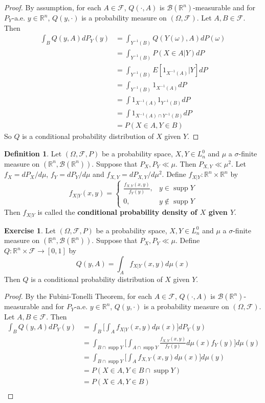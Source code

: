 \documentclass[12pt]{amsart}
\theoremstyle{definition}
\newtheorem{defn}[definition]{Definition}
\newtheorem{ex}[definition]{Exercise}
\DeclareMathOperator{\supp}{supp}
\newcommand{\sig}{\sigma}
\newcommand{\om}{\omega}
\newcommand{\Om}{\Omega}
\newcommand{\R}{\mathbb{R}}
\newcommand{\MB}{\mathcal{B}}
\newcommand{\MF}{\mathcal{F}}
\begin{document}
	\begin{proof}
	By assumption, for each $A \in \MF$, $Q(\cdot, A)$ is $\MB(\R^n)$-measurable and for $P_Y$-a.e. $y \in \R^n$, $Q(y, \cdot)$ is a probability measure on $(\Om, \MF)$. Let $A,B \in \MF$. Then
	\begin{align*}
	\int_B Q(y, A) dP_Y(y)
	&= \int_{Y^{-1}(B)} Q(Y(\om), A) dP(\om) \\
	&= \int_{Y^{-1}(B)}  P(X \in A|Y) dP \\
	&= \int_{Y^{-1}(B)}  E[1_{X^{-1}(A)}|Y] dP \\
	&= \int_{Y^{-1}(B)}  1_{X^{-1}(A)} dP \\
	&= \int 1_{X^{-1}(A)}  1_{Y^{-1}(B)} dP \\
	&= \int 1_{X^{-1}(A) \cap Y^{-1}(B)} dP \\
	&= P(X \in A, Y \in B)
	\end{align*}
	So $Q$ is a conditional probability distribution of $X$ given $Y$.
	\end{proof}
	
	\begin{defn}
	Let $(\Om, \MF, P)$ be a probability space, $X,Y \in L_n^0$ and $\mu$ a $\sig$-finite measure on $(\R^n, \MB(\R^n))$. Suppose that $P_X, P_Y \ll \mu$. Then $P_{X,Y} \ll \mu^2$. Let $f_X = dP_X/d \mu$, $f_Y = dP_Y/d \mu$ and $f_{X,Y} = dP_{X,Y}/d \mu^2$. Define $f_{X|Y}: \R^n \times \R^n$ by 
	\[
	f_{X|Y}(x,y) = 
	\begin{cases}
	\frac{f_{X,Y}(x,y)}{f_Y(y)},& y \in \supp Y \\
	0, &y \not \in \supp Y 
	\end{cases}
	\] 
	Then $f_{X|Y}$ is called the \textbf{conditional probability density of $X$ given $Y$}.
	\end{defn}	
	
	\begin{ex}
	Let $(\Om, \MF, P)$ be a probability space, $X,Y \in L_n^0$ and $\mu$ a $\sig$-finite measure on $(\R^n, \MB(\R^n))$. Suppose that $P_X, P_Y \ll \mu$. Define $Q: \R^n \times \MF \rightarrow [0,1]$ by 
	$$Q(y, A) = \int_A f_{X|Y}(x,y) d\mu(x)$$ 
	Then $Q$ is a conditional probability distribution of $X$ given $Y$.
	\end{ex}	
	
	\begin{proof}
	By the Fubini-Tonelli Theorem, for each $A \in \MF$, $Q(\cdot, A)$ is $\MB(\R^n)$-measurable and for $P_Y$-a.e. $y \in \R^n$, $Q(y, \cdot)$ is a probability measure on $(\Om, \MF)$. Let $A, B \in \MF$. Then 
	\begin{align*}
	\int_B Q(y, A) dP_Y(y)
	&= \int_B \bigg[ \int_A f_{X|Y}(x,y) d\mu(x) \bigg] dP_Y(y) \\
	&= \int_{B \cap \supp Y} \bigg[ \int_{A \cap \supp Y} \frac{f_{X,Y}(x,y)}{f_Y(y)} d\mu(x) f_Y(y) \bigg] d \mu(y) \\
	&= \int_{B \cap \supp Y}  \bigg[\int_A f_{X,Y}(x,y) d\mu(x) \bigg] d \mu(y) \\
	&= P(X \in A, Y \in B \cap \supp Y) \\
	&= P(X \in A, Y \in B) \\	
	\end{align*}
	\end{proof}
	
\end{document}
